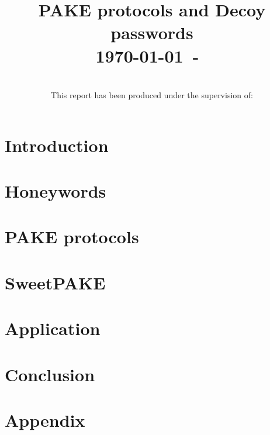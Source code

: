 \documentclass[conference, compsoc]{IEEEtran}
\begin{document}
\title{PAKE protocols and Decoy passwords\\
{\small \today~-~\currenttime}}

\author{
    \\
    This report has been produced under the supervision of:\\
    }

\maketitle

\begin{abstract}
\end{abstract}

\begin{IEEEkeywords}
\end{IEEEkeywords}

\section{Introduction}


\section{Honeywords}


\section{PAKE protocols}


\section{SweetPAKE}


\section{Application}


\section{Conclusion}



\section{Appendix}
\printbibliography
\end{document}
